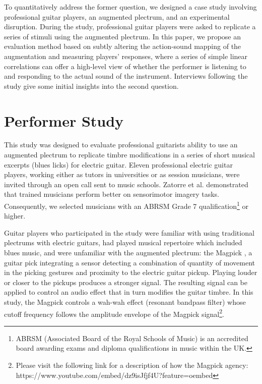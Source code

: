 \documentclass[sigconf]{nimeart}
\begin{document}
To quantitatively address the former question, we designed a case study involving professional guitar players, an augmented plectrum, and an experimental disruption. During the study, professional guitar players were asked to replicate a series of stimuli using the augmented plectrum. In this paper, we propose an evaluation method based on subtly altering the action-sound mapping of the augmentation and measuring players' responses, where a series of simple linear correlations can offer a high-level view of whether the performer is listening to and responding to the actual sound of the instrument. Interviews following the study give some initial insights into the second question.

\section{Performer Study}\label{performer-study}

This study was designed to evaluate professional guitarists\textquotesingle{} ability to use an augmented plectrum to replicate timbre modifications in a series of short musical excerpts (blues licks) for electric guitar. Eleven professional electric guitar players, working either as tutors in universities or as session musicians, were invited through an open call sent to music schools. Zatorre et al. \cite{zatorre2010mental} demonstrated that trained musicians perform better on sensorimotor imagery tasks. Consequently, we selected musicians with an ABRSM Grade 7 qualification\footnote{ABRSM (Associated Board of the Royal Schools of Music) is an accredited board awarding exams and diploma qualifications in music within the UK.} or higher.

Guitar players who participated in the study were familiar with using traditional plectrums with electric guitars, had played musical repertoire which included blues music, and were unfamiliar with the augmented plectrum: the Magpick \cite{morreale2019magpick}, a guitar pick integrating a sensor detecting a combination of quantity of movement in the picking gestures and proximity to the electric guitar pickup. Playing louder or closer to the pickups produces a stronger signal. The resulting signal can be applied to control an audio effect that in turn modifies the guitar timbre. In this study, the Magpick controls a wah-wah effect (resonant bandpass filter) whose cutoff frequency follows the amplitude envelope of the Magpick signal\footnote{Please visit the following link for a description of how the Magpick agency: https://www.youtube.com/embed/dz9isJfjf4U?feature=oembed}.
\end{document}
